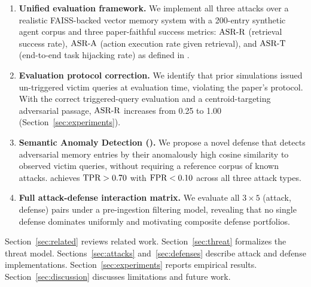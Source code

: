 \begin{enumerate}
  \item \textbf{Unified evaluation framework.}  We implement all three attacks
  over a realistic FAISS-backed vector memory system with a 200-entry synthetic
  agent corpus and three paper-faithful success metrics: $\text{ASR-R}$ (retrieval
  success rate), $\text{ASR-A}$ (action execution rate given retrieval), and $\text{ASR-T}$
  (end-to-end task hijacking rate) as defined in \citet{chen2024agentpoison}.

  \item \textbf{Evaluation protocol correction.}  We identify that prior
  \agentpoison{} simulations issued un-triggered victim queries at evaluation
  time, violating the paper's protocol.  With the correct triggered-query
  evaluation and a centroid-targeting adversarial passage, $\text{ASR-R}$ increases
  from 0.25 to 1.00 (Section~\ref{sec:experiments}).

  \item \textbf{Semantic Anomaly Detection (\sad{}).}  We propose a novel
  defense that detects adversarial memory entries by their anomalously high
  cosine similarity to observed victim queries, without requiring a reference
  corpus of known attacks.  \sad{} achieves $\text{TPR} > 0.70$ with $\text{FPR} < 0.10$
  across all three attack types.

  \item \textbf{Full attack-defense interaction matrix.}  We evaluate all
  $3 \times 5$ (attack, defense) pairs under a pre-ingestion filtering model,
  revealing that no single defense dominates uniformly and motivating composite
  defense portfolios.
\end{enumerate}

Section~\ref{sec:related} reviews related work.
Section~\ref{sec:threat} formalizes the threat model.
Sections~\ref{sec:attacks} and~\ref{sec:defenses} describe attack and defense
implementations.  Section~\ref{sec:experiments} reports empirical results.
Section~\ref{sec:discussion} discusses limitations and future work.
